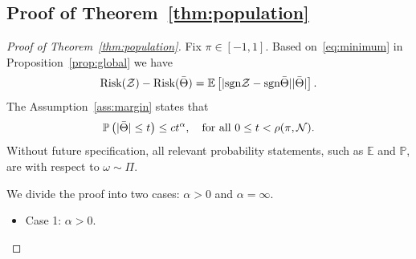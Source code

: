 \documentclass[11pt]{article}
\theoremstyle{plain}
\theoremstyle{definition}
\def\sign{\textup{sgn}}
\def\risk{\textup{Risk}}
\begin{document}
\subsection{Proof of Theorem~\ref{thm:population}}
\begin{proof}[Proof of Theorem~\ref{thm:population}]
Fix $\pi\in[-1,1]$. Based on~\eqref{eq:minimum} in Proposition~\ref{prop:global} we have
\begin{equation}\label{eq:population2}
\risk(\tZ)- \risk(\bar \Theta) = \mathbb{E}\left[|\sign \tZ-\sign\bar \Theta||\bar \Theta|\right].
\end{equation}
The Assumption~\ref{ass:margin} states that
\begin{equation}\label{eq:ass}
\mathbb{P}\left(|\bar \Theta | \leq t\right)\leq ct^\alpha,\quad \text{for all } 0\leq t< \rho(\pi,\mathcal{N}).
\end{equation}
Without future specification, all relevant probability statements, such as $\mathbb{E}$ and $\mathbb{P}$, are with respect to $\omega\sim \Pi$. 

We divide the proof into two cases: $\alpha >0$ and $\alpha = \infty$.
\begin{itemize}[leftmargin=*,topsep=0pt,itemsep=-1ex,partopsep=1ex,parsep=1ex]
\item Case 1: $\alpha>0$. 


\end{itemize}
\end{proof}
\end{document}
